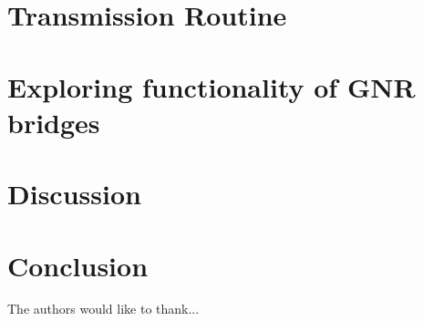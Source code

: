\documentclass[aps, prb, a4paper, english, 12pt, onecolumn, longbibliography, amsmath, amssymb, colorinlistoftodos, floatfix, svgnames]{revtex4-2}
\numberwithin{equation}{section}
\begin{document}
\section{Transmission Routine}\label{transec}

\section{Exploring functionality of GNR bridges}\label{testsec}

\section{Discussion}

\section{Conclusion}

\newpage
\begin{acknowledgments}
	The authors would like to thank...
\end{acknowledgments}
\onecolumngrid


\newpage
\listoffigures
\listoftables
\listoflistings
\newpage

\end{document}
